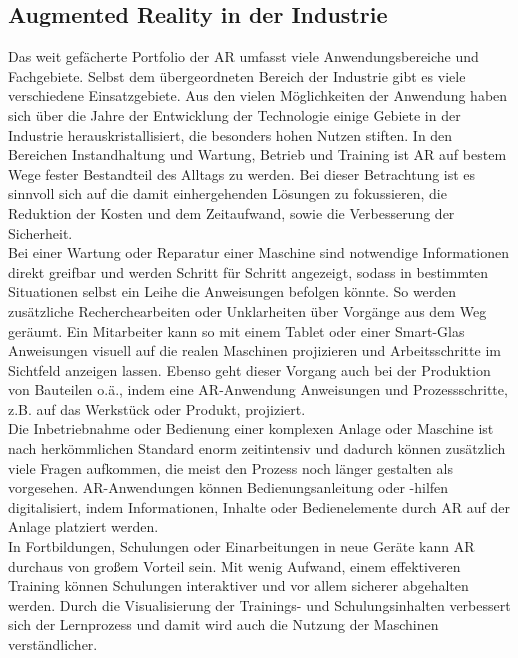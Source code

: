\subsection{Augmented Reality in der Industrie}
Das weit gefächerte Portfolio der \acl{AR} umfasst viele Anwendungsbereiche und Fachgebiete. Selbst dem übergeordneten Bereich der Industrie 
gibt es viele verschiedene Einsatzgebiete. Aus den vielen Möglichkeiten der Anwendung haben sich über die Jahre der Entwicklung der Technologie 
einige Gebiete in der Industrie herauskristallisiert, die besonders hohen Nutzen stiften. \cite{einsatzgebietear.2017a} In den Bereichen 
Instandhaltung und Wartung, Betrieb und Training ist \acl{AR} auf bestem Wege fester Bestandteil des Alltags zu werden. Bei dieser Betrachtung 
ist es sinnvoll sich auf die damit einhergehenden Lösungen zu fokussieren, die Reduktion der Kosten und dem Zeitaufwand, sowie die Verbesserung 
der Sicherheit. \cite{studieptc.2020j} 
\\ 
\linebreak
Bei einer Wartung oder Reparatur einer Maschine sind notwendige Informationen direkt greifbar und werden Schritt für Schritt angezeigt, sodass 
in bestimmten Situationen selbst ein Leihe die Anweisungen befolgen könnte. So werden zusätzliche Recherchearbeiten oder Unklarheiten über 
Vorgänge aus dem Weg geräumt. Ein Mitarbeiter kann so mit einem Tablet oder einer Smart-Glas Anweisungen visuell auf die realen Maschinen 
projizieren und Arbeitsschritte im Sichtfeld anzeigen lassen. Ebenso geht dieser Vorgang auch bei der Produktion von Bauteilen o.ä., indem 
eine \acs{AR}-Anwendung Anweisungen und Prozessschritte, z.B. auf das Werkstück oder Produkt, projiziert.
\\ 
Die Inbetriebnahme oder Bedienung einer komplexen Anlage oder Maschine ist nach herkömmlichen Standard enorm zeitintensiv und dadurch können
zusätzlich viele Fragen aufkommen, die meist den Prozess noch länger gestalten als vorgesehen. \acs{AR}-Anwendungen können 
Bedienungsanleitung oder -hilfen digitalisiert, indem Informationen, Inhalte oder Bedienelemente durch \acl{AR} auf der Anlage platziert werden. 
\\ 
In Fortbildungen, Schulungen oder Einarbeitungen in neue Geräte kann \acs{AR} durchaus von großem Vorteil sein. Mit wenig Aufwand, einem 
effektiveren Training können Schulungen interaktiver und vor allem sicherer abgehalten werden. Durch die Visualisierung der Trainings- und 
Schulungsinhalten verbessert sich der Lernprozess und damit wird auch die Nutzung der Maschinen verständlicher. \cite{einsatzgebietear.2017a}

